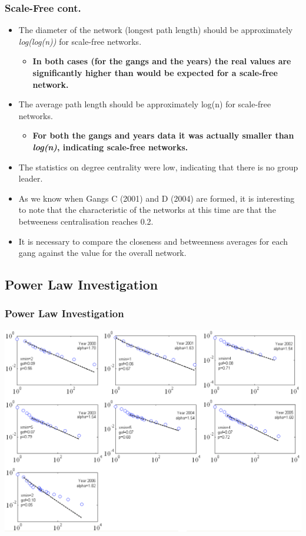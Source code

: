\documentclass[pdftex]{beamer}
\begin{document}
\begin{frame}
\frametitle{Scale-Free cont.}
\begin{itemize}
\item The diameter of the network (longest path length) should be
  approximately {\emph{log(log(n))}} for scale-free networks.
\begin{itemize}
\item {\textbf{In both cases (for the gangs and the years) the real values are
  significantly higher than would be expected for a scale-free
  network.}}
\end{itemize}
\pause
\item The average path length should be approximately log(n) for
  scale-free networks. 
\begin{itemize}
\item {\textbf{For both the gangs and years data it was actually smaller
  than {\emph{log(n)}}, indicating scale-free networks.}}
\end{itemize}
\pause
\item The statistics on degree centrality were low, indicating that
  there is no group leader. 
\item As we know when Gangs C (2001) and D (2004) are formed, it is
  interesting to note that the characteristic of the networks at this
  time are that the betweeness centralisation reaches 0.2.
\item It is necessary to compare the closeness and betweenness
  averages for each gang against the value for the overall network.
\end{itemize}
\end{frame}

\subsection{Power Law Investigation}

\begin{frame}
\frametitle{Power Law Investigation}
\begin{center}
\includegraphics[width=0.9\paperwidth]{../images/clausetcumulative.pdf}
\end{center}
\end{frame}
\end{document}
